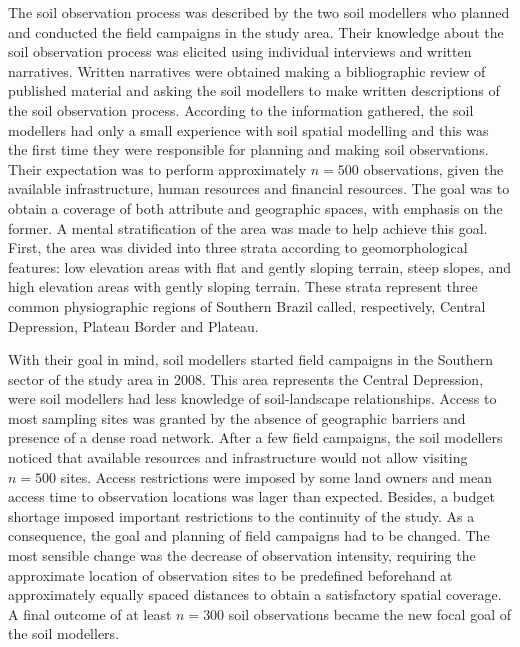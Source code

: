 The soil observation process was described by the two soil modellers who planned and conducted the field 
campaigns in the study area. Their knowledge about the soil observation process was elicited using individual 
interviews and written narratives. Written narratives were obtained making a bibliographic review of published 
material and asking the soil modellers to make written descriptions of the soil observation process. According 
to the information gathered, the soil modellers had only a small experience with soil spatial modelling and 
this was the first time they were responsible for planning and making soil observations. Their expectation was 
to perform approximately $n = 500$ observations, given the available infrastructure, human resources and 
financial resources. The goal was to obtain a  coverage of both attribute and geographic 
spaces, with emphasis on the former. A mental stratification of the area was made to help achieve this goal. 
First, the area was divided into three strata according to geomorphological features: low elevation areas with 
flat and gently sloping terrain, steep slopes, and high elevation areas with gently sloping terrain. These 
strata represent three common physiographic regions of Southern Brazil called, respectively, Central 
Depression, Plateau Border and Plateau.

With their goal in mind, soil modellers started field campaigns in the Southern sector of the study area in 
\num{2008}. This area represents the Central Depression, were soil modellers had less knowledge of 
soil-landscape relationships. Access to most sampling sites was granted by the absence of geographic barriers 
and presence of a dense road network. After a few field campaigns, the soil modellers noticed that available 
resources and infrastructure would not allow visiting $n = 500$ sites. Access restrictions were imposed by some 
land owners and mean access time to observation locations was lager than expected. Besides, a budget shortage 
imposed important restrictions to the continuity of the study. As a consequence, the goal and planning of 
field campaigns had to be changed. The most sensible change was the decrease of observation intensity, 
requiring the approximate location of observation sites to be predefined beforehand at approximately equally 
spaced distances to obtain a satisfactory spatial coverage. A final outcome of at least $n = 300$ soil 
observations became the new focal goal of the soil modellers.

